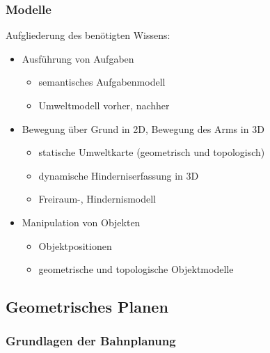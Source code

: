 \subsubsection*{Modelle}

Aufgliederung des benötigten Wissens:
\begin{itemize}
\item Ausführung von Aufgaben
\begin{itemize}
\item semantisches Aufgabenmodell
\item Umweltmodell vorher, nachher
\end{itemize}
\item Bewegung über Grund in 2D, Bewegung des Arms in 3D
\begin{itemize}
\item statische Umweltkarte (geometrisch und topologisch)
\item dynamische Hinderniserfassung in 3D
\item Freiraum-, Hindernismodell
\end{itemize}
\item Manipulation von Objekten
\begin{itemize}
\item Objektpositionen
\item geometrische und topologische Objektmodelle
\end{itemize}
\end{itemize}

\subsection{Geometrisches Planen}

\subsubsection*{Grundlagen der Bahnplanung}

